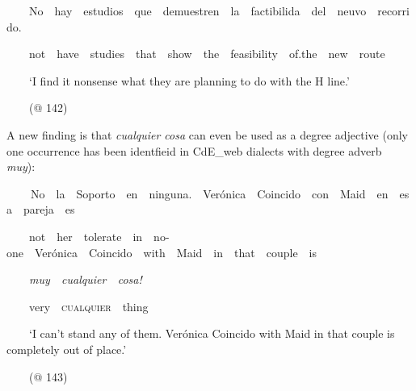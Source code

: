\begin{styleStandard}
\ \ \ \ No\ \ hay\ \ estudios\ \ que\ \ demuestren\ \ la\ \ factibilida\ \ del\ \ neuvo\ \ recorrido.
\end{styleStandard}

\begin{styleStandard}
\ \ \ \ not\ \ have\ \ studies\ \ that\ \ show\ \ the\ \ feasibility\ \ of.the\ \ new\ \ route
\end{styleStandard}

\begin{styleStandard}
\ \ \ \ ‘I find it nonsense what they are planning to do with the H line.’
\end{styleStandard}

\begin{styleStandard}
\ \ \ \ (@ 142)
\end{styleStandard}

\begin{styleStandard}
A new finding is that \textit{cualquier cosa} can even be used as a degree adjective (only one occurrence has been identfieid in CdE\_web dialects with degree adverb \textit{muy}):
\end{styleStandard}

\begin{styleStandard}
\textbf{\ \ }\ \ No\ \ la\ \ Soporto\ \ en\ \ ninguna.\ \ Verónica\ \ Coincido\ \ con\ \ Maid\ \ en\ \ esa\ \ pareja\ \ es
\end{styleStandard}

\begin{styleStandard}
\ \ \ \ not\ \ her\ \ tolerate\ \ in\ \ no-one\ \ Verónica\ \ Coincido\ \ with\ \ Maid\ \ in\ \ that\ \ couple\ \ is
\end{styleStandard}

\begin{styleStandard}
\ \ \ \ \textit{muy\ \ cualquier\ \ cosa!\ \ }
\end{styleStandard}

\begin{styleStandard}
\ \ \ \ very\ \ \textsc{cualquier}\ \ thing\ \ 
\end{styleStandard}

\begin{styleStandard}
\ \ \ \ ‘I can’t stand any of them. Verónica Coincido with Maid in that couple is completely out of place.’
\end{styleStandard}

\begin{styleStandard}
\ \ \ \ (@ 143) 
\end{styleStandard}

